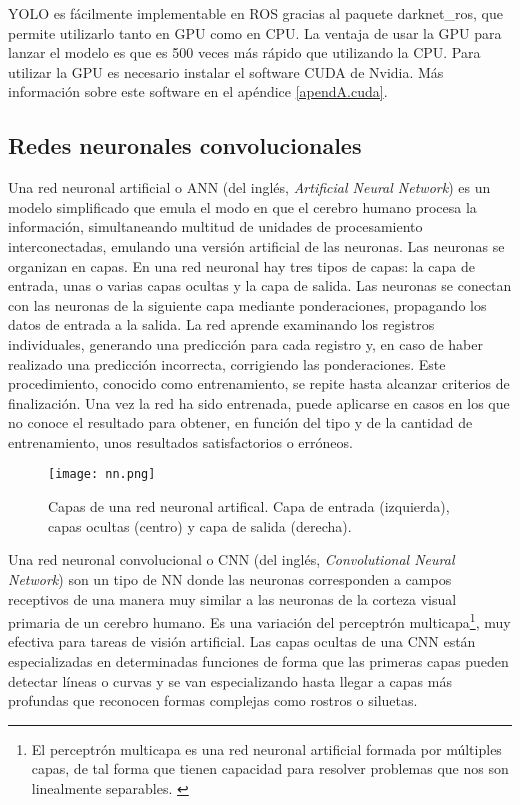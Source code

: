 YOLO es fácilmente implementable en ROS gracias al paquete darknet\_ros, que permite utilizarlo tanto en GPU como en CPU. La ventaja de usar la GPU para lanzar el modelo es que es 500 veces más rápido que utilizando la CPU. Para utilizar la GPU es necesario instalar el software CUDA de Nvidia. Más información sobre este software en el apéndice \ref{apendA.cuda}.\\

\subsection{Redes neuronales convolucionales}

Una red neuronal artificial o ANN (del inglés, \textit{Artificial Neural Network}) es un modelo simplificado que emula el modo en que el cerebro humano procesa la información, simultaneando multitud de unidades de procesamiento interconectadas, emulando una versión artificial de las neuronas. Las neuronas se organizan en capas. En una red neuronal hay tres tipos de capas: la capa de entrada, unas o varias capas ocultas y la capa de salida. Las neuronas se conectan con las neuronas de la siguiente capa mediante ponderaciones, propagando los datos de entrada a la salida. La red aprende examinando los registros individuales, generando una predicción para cada registro y, en caso de haber realizado una predicción incorrecta, corrigiendo las ponderaciones. Este procedimiento, conocido como entrenamiento, se repite hasta alcanzar criterios de finalización.  Una vez la red ha sido entrenada, puede aplicarse en casos en los que no conoce el resultado para obtener, en función del tipo y de la cantidad de entrenamiento, unos resultados satisfactorios o erróneos. \cite{nn}\\

\begin{figure}[h]
	\begin{center} 
		\texttt{[image: nn.png]}
	\end{center}
	\caption{Capas de una red neuronal artifical. Capa de entrada (izquierda), capas ocultas (centro) y capa de salida (derecha). \cite{foto_nn}}
	\label{fig:nn}
\end{figure}

Una red neuronal convolucional o CNN (del inglés, \textit{Convolutional Neural Network}) son un tipo de NN donde las neuronas corresponden a campos receptivos de una manera muy similar a las neuronas de la corteza visual primaria de un cerebro humano. Es una variación del perceptrón multicapa\footnote{El perceptrón multicapa es una red neuronal artificial formada por múltiples capas, de tal forma que tienen capacidad para resolver problemas que nos son linealmente separables. \cite{perceptron}}, muy efectiva para tareas de visión artificial. Las capas ocultas de una CNN están especializadas en determinadas funciones de forma que las primeras capas pueden detectar líneas o curvas y se van especializando hasta llegar a capas más profundas que reconocen formas complejas como rostros o siluetas. \cite{cnn} \\


